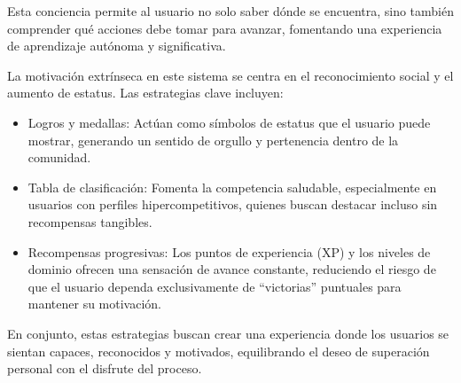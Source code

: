Esta conciencia permite al usuario no solo saber dónde se encuentra, sino también comprender qué acciones debe tomar para avanzar, fomentando una experiencia de aprendizaje autónoma y significativa.

La motivación extrínseca en este sistema se centra en el reconocimiento social y el aumento de estatus. Las estrategias clave incluyen:
\begin{itemize}
    \item Logros y medallas: Actúan como símbolos de estatus que el usuario puede mostrar, generando un sentido de orgullo y pertenencia dentro de la comunidad.
    \item Tabla de clasificación: Fomenta la competencia saludable, especialmente en usuarios con perfiles hipercompetitivos, quienes buscan destacar incluso sin recompensas tangibles.
    \item Recompensas progresivas: Los puntos de experiencia (XP) y los niveles de dominio ofrecen una sensación de avance constante, reduciendo el riesgo de que el usuario dependa exclusivamente de \enquote{victorias} puntuales para mantener su motivación.
\end{itemize}

En conjunto, estas estrategias buscan crear una experiencia donde los usuarios se sientan capaces, reconocidos y motivados, equilibrando el deseo de superación personal con el disfrute del proceso.

